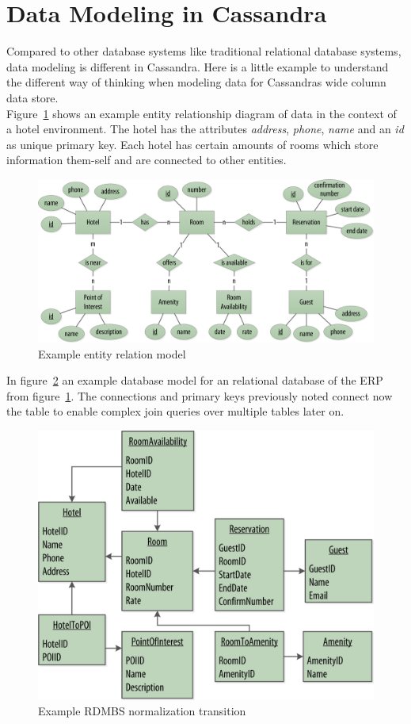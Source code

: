 \section{Data Modeling in Cassandra}  %

Compared to other database systems like traditional relational database systems, data modeling is different in Cassandra. Here is a little example to understand the different way of thinking when modeling data for Cassandras wide column data store. \\

Figure~\ref{fig:cassandra:model_data0} shows an example entity relationship diagram of data in the context of a hotel environment. The hotel has the attributes \textit{address}, \textit{phone}, \textit{name} and an \textit{id} as unique primary key. Each hotel has certain amounts of rooms which store information them-self and are connected to other entities.

\begin{figure}[H]
    \centering
    \includegraphics[width=0.75\columnwidth]{img/model_example_entity_relation_step0.png}
    \caption{Example entity relation model \autocite{cassandra_oreilly}}
    \label{fig:cassandra:model_data0}
\end{figure}

In figure~\ref{fig:cassandra:model_data1} an example database model for an relational database of the ERP from figure~\ref{fig:cassandra:model_data0}.
The connections and primary keys previously noted connect now the table to enable complex join queries over multiple tables later on.

\begin{figure}[H]
    \centering
    \includegraphics[width=0.75\columnwidth]{img/model_example_rdbms_step1.png}
    \caption{Example RDMBS normalization transition \autocite{cassandra_oreilly}}
    \label{fig:cassandra:model_data1}
\end{figure}

